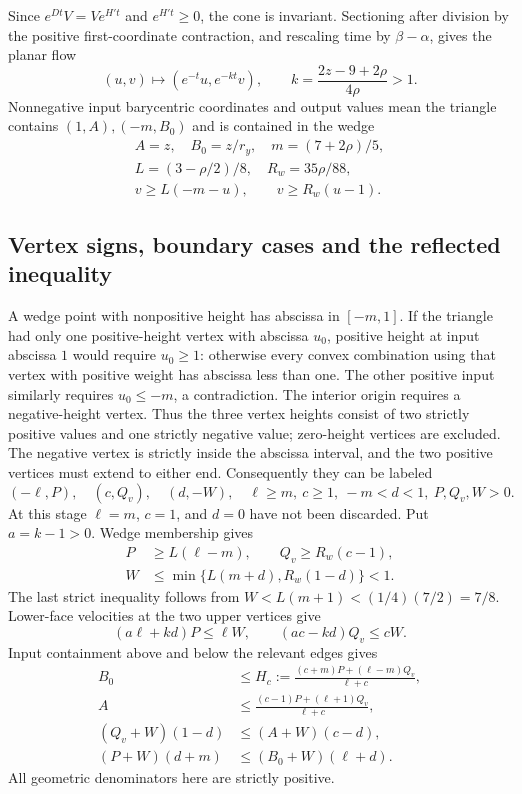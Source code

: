 Since $e^{Dt}V=Ve^{H't}$ and $e^{H't}\ge0$, the cone is invariant.
Sectioning after division by the positive first-coordinate contraction,
and rescaling time by $\beta-\alpha$, gives the planar flow
\begin{equation}
 (u,v)\longmapsto(e^{-t}u,e^{-kt}v),\qquad
 k=\frac{2z-9+2\rho}{4\rho}>1.\label{eq:flow}
\end{equation}
Nonnegative input barycentric coordinates and output values mean the
triangle contains $(1,A),(-m,B_0)$ and is contained in the wedge
\begin{gather}
 A=z,\quad B_0=z/r_y,\quad m=(7+2\rho)/5,\\
 L=(3-\rho/2)/8,\quad R_w=35\rho/88,\\
 v\ge L(-m-u),\qquad v\ge R_w(u-1).\label{eq:wedge}
\end{gather}

\subsection{Vertex signs, boundary cases and the reflected inequality}
A wedge point with nonpositive height has abscissa in $[-m,1]$.
If the triangle had only one positive-height vertex with abscissa $u_0$,
positive height at input abscissa $1$ would require $u_0\ge1$: otherwise
every convex combination using that vertex with positive weight has
abscissa less than one. The other positive input similarly requires
$u_0\le-m$, a contradiction. The interior origin requires a
negative-height vertex. Thus the three vertex heights consist of two
strictly positive values and one strictly negative value; zero-height
vertices are excluded. The negative vertex is strictly inside the
abscissa interval, and the two positive vertices must extend to either
end. Consequently they can be labeled
\begin{equation}
 (-\ell,P),\quad(c,Q_v),\quad(d,-W),\quad
 \ell\ge m,\ c\ge1,\ -m<d<1,\ P,Q_v,W>0.\label{eq:vertices}
\end{equation}
At this stage $\ell=m$, $c=1$, and $d=0$ have not been discarded.
Put $a=k-1>0$. Wedge membership gives
\begin{align}
 P&\ge L(\ell-m),\qquad Q_v\ge R_w(c-1),\nonumber\\
 W&\le\min\{L(m+d),R_w(1-d)\}<1.\label{eq:ineq1}
\end{align}
The last strict inequality follows from
$W<L(m+1)<(1/4)(7/2)=7/8$. Lower-face velocities at the two upper
vertices give
\begin{equation}
 (a\ell+kd)P\le\ell W,\qquad
 (ac-kd)Q_v\le cW.\label{eq:ineq2}
\end{equation}
Input containment above and below the relevant edges gives
\begin{align}
 B_0&\le H_c:=\frac{(c+m)P+(\ell-m)Q_v}{\ell+c},\label{eq:height}\\
 A&\le\frac{(c-1)P+(\ell+1)Q_v}{\ell+c},\label{eq:upperA}\\
 (Q_v+W)(1-d)&\le(A+W)(c-d),\label{eq:lowerA}\\
 (P+W)(d+m)&\le(B_0+W)(\ell+d).\label{eq:lowerB}
\end{align}
All geometric denominators here are strictly positive.

